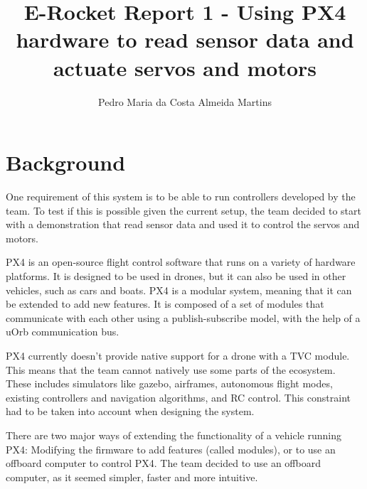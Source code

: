 \documentclass[a4paper]{article}
\begin{document}
\title{E-Rocket Report 1 - Using PX4 hardware to read sensor data and actuate servos and motors}
\author{Pedro Maria da Costa Almeida Martins}

\maketitle
\thispagestyle{empty}
\clearpage


\tableofcontents
\thispagestyle{empty}
\clearpage



\section{Background}

One requirement of this system is to be able to run controllers developed by the team. 
To test if this is possible given the current setup, the team decided to start with a demonstration that read sensor data and used it to control the servos and motors. 

PX4 is an open-source flight control software that runs on a variety of hardware platforms.
It is designed to be used in drones, but it can also be used in other vehicles, such as cars and boats.
PX4 is a modular system, meaning that it can be extended to add new features.
It is composed of a set of modules that communicate with each other using a publish-subscribe model, with the help of a uOrb communication bus. 

PX4 currently doesn't provide native support for a drone with a TVC module. This means that the team cannot natively use some parts of the ecosystem. 
These includes simulators like gazebo, airframes, autonomous flight modes, existing controllers and navigation algorithms, and RC control. 
This constraint had to be taken into account when designing the system. 

There are two major ways of extending the functionality of a vehicle running PX4: Modifying the firmware to add features (called modules), or to use an offboard computer to control PX4. 
The team decided to use an offboard computer, as it seemed simpler, faster and more intuitive. 
\end{document}
